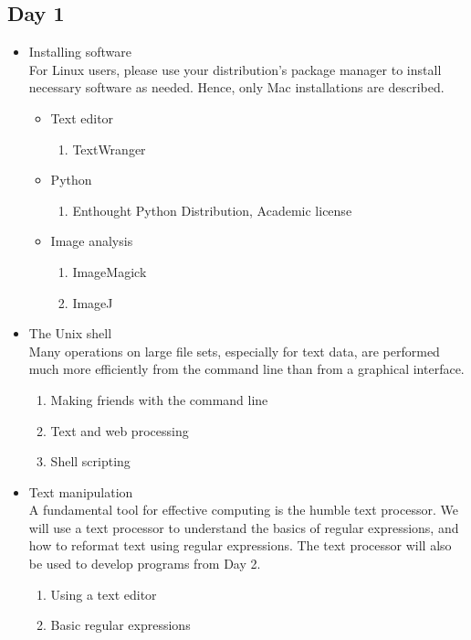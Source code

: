 \documentclass[11pt,letter]{article}
\begin{document}
\subsection{Day 1}
\label{sec-1-1}
\begin{itemize}

\item Installing software\\
\label{sec-1-1-1}%
For Linux users, please use your distribution's package manager to install necessary software as needed. Hence, only Mac installations are described.
\begin{itemize}

\item Text editor
\label{sec-1-1-1-1}%
\begin{enumerate}
\item TextWranger
\end{enumerate}

\item Python
\label{sec-1-1-1-2}%
\begin{enumerate}
\item Enthought Python Distribution, Academic license
\end{enumerate}

\item Image analysis
\label{sec-1-1-1-3}%
\begin{enumerate}
\item ImageMagick
\item ImageJ
\end{enumerate}
\end{itemize} %

\item The Unix shell\\
\label{sec-1-1-2}%
Many operations on large file sets, especially for text data, are performed much more efficiently from the command line than from a graphical interface. 
\begin{enumerate}
\item Making friends with the command line
\item Text and web processing
\item Shell scripting
\end{enumerate}

\item Text manipulation\\
\label{sec-1-1-3}%
A fundamental tool for effective computing is the humble text processor. We will use a text processor to understand the basics of regular expressions, and how to reformat text using regular expressions. The text processor will also be used to develop programs from Day 2.
\begin{enumerate}
\item Using a text editor
\item Basic regular expressions
\end{enumerate}
\end{itemize} %
\end{document}
